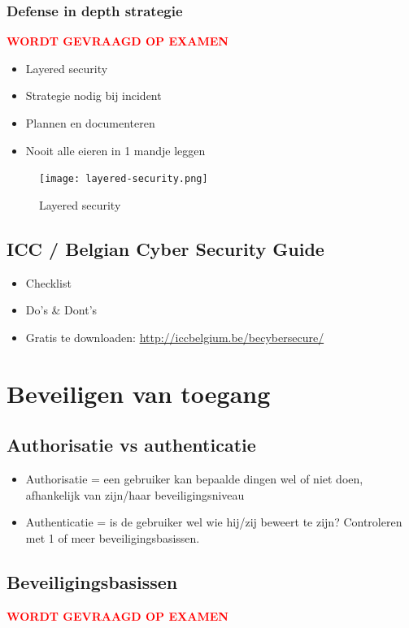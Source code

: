 \documentclass{article}
\newcommand{\bold}[1]{\textbf{#1}}
\begin{document}
\subsubsection{Defense in depth strategie}
\textcolor{red}{\bold{WORDT GEVRAAGD OP EXAMEN}}

\begin{itemize}
    \item Layered security
    \item Strategie nodig bij incident
    \item Plannen en documenteren
    \item Nooit alle eieren in 1 mandje leggen
\end{itemize}

\begin{figure}[H]
    \centering
    \texttt{[image: layered-security.png]}
    \caption{Layered security}
\end{figure}

\subsection{ICC / Belgian Cyber Security Guide}

\begin{itemize}
    \item Checklist
    \item Do's \& Dont's
    \item Gratis te downloaden: \url{http://iccbelgium.be/becybersecure/}
\end{itemize}


\section{Beveiligen van toegang}

\subsection{Authorisatie vs authenticatie}

\begin{itemize}
    \item Authorisatie = een gebruiker kan bepaalde dingen wel of niet doen, afhankelijk van zijn/haar beveiligingsniveau
    \item Authenticatie = is de gebruiker wel wie hij/zij beweert te zijn? Controleren met 1 of meer beveiligingsbasissen.
\end{itemize}

\subsection{Beveiligingsbasissen}
\textcolor{red}{\bold{WORDT GEVRAAGD OP EXAMEN}}
\end{document}
